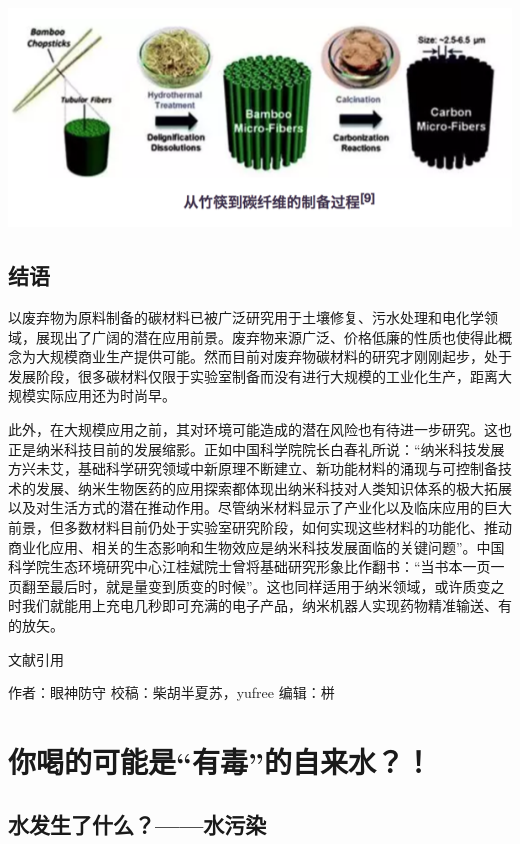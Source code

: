 \documentclass[]{book}
\begin{document}
\includegraphics[width=8.33in]{images/nano3}

\subsection{结语}

以废弃物为原料制备的碳材料已被广泛研究用于土壤修复、污水处理和电化学领域，展现出了广阔的潜在应用前景。废弃物来源广泛、价格低廉的性质也使得此概念为大规模商业生产提供可能。然而目前对废弃物碳材料的研究才刚刚起步，处于发展阶段，很多碳材料仅限于实验室制备而没有进行大规模的工业化生产，距离大规模实际应用还为时尚早。

此外，在大规模应用之前，其对环境可能造成的潜在风险也有待进一步研究。这也正是纳米科技目前的发展缩影。正如中国科学院院长白春礼所说：``纳米科技发展方兴未艾，基础科学研究领域中新原理不断建立、新功能材料的涌现与可控制备技术的发展、纳米生物医药的应用探索都体现出纳米科技对人类知识体系的极大拓展以及对生活方式的潜在推动作用。尽管纳米材料显示了产业化以及临床应用的巨大前景，但多数材料目前仍处于实验室研究阶段，如何实现这些材料的功能化、推动商业化应用、相关的生态影响和生物效应是纳米科技发展面临的关键问题''。中国科学院生态环境研究中心江桂斌院士曾将基础研究形象比作翻书：``当书本一页一页翻至最后时，就是量变到质变的时候''。这也同样适用于纳米领域，或许质变之时我们就能用上充电几秒即可充满的电子产品，纳米机器人实现药物精准输送、有的放矢。

文献引用

作者：眼神防守 校稿：柴胡半夏苏，yufree 编辑：栟

\section{\texorpdfstring{你喝的可能是``有毒''的自来水？！}{你喝的可能是有毒的自来水？！}}

\subsection{水发生了什么？------水污染}
\end{document}
